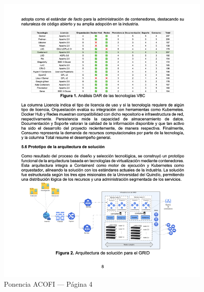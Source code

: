 \begin{figure}[H]
    \centering
    \begin{tcolorbox}[
        colback=white,
        colframe=gray!50,
        boxrule=1pt,
        arc=2pt,
        boxsep=5pt,
        left=3pt,
        right=3pt,
        top=3pt,
        bottom=3pt,
        drop shadow
    ]
        \includegraphics[width=0.95\textwidth,keepaspectratio]{apendices/ACOFI/pagina_4.png}
    \end{tcolorbox}
    \caption{Ponencia ACOFI --- Página 4}\label{fig:acofi-pagina-4}
\end{figure}
\FloatBarrier%
